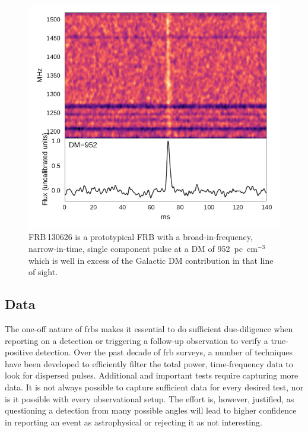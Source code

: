 \documentclass[a4paper,fleqn,usenatbib]{mnras}
\begin{document}
\begin{figure}
    \includegraphics[width=1.0\linewidth]{figures/FRB130626.pdf}
    \caption{FRB\,130626 is a prototypical FRB with a broad-in-frequency,
    narrow-in-time, single component pulse at a DM of 952~pc~cm$^{-3}$ which is
    well in excess of the Galactic DM contribution in that line of sight.
    }
    \label{fig:FRB130626}
\end{figure}

\subsection{Data}
\label{sec:detect_report}

The one-off nature of \glspl{frb} makes it essential to do sufficient
due-diligence when reporting on a detection or triggering a follow-up
observation to verify a true-positive detection. Over the past decade of
\gls{frb} surveys, a number of techniques have been developed to efficiently
filter the total power, time-frequency data to look for dispersed pulses.
Additional and important tests require capturing more data. It is not always
possible to capture sufficient data for every desired test, nor is it possible
with every observational setup.  The effort is, however, justified, as
questioning a detection from many possible angles will lead to higher confidence
in reporting an event as astrophysical or rejecting it as not interesting. 
\end{document}

